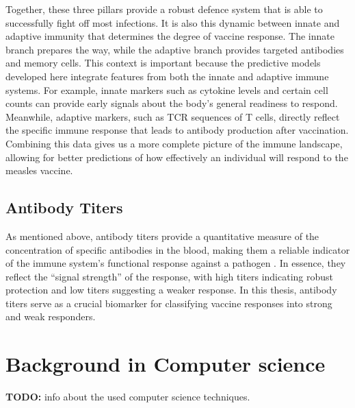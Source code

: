 \documentclass[12pt,a4paper]{report}
\newcommand{\todo}[1]{%
  \par\noindent%
  \begin{tcolorbox}[colback=yellow, colframe=black, boxrule=0.5pt, sharp corners, width=\linewidth, before skip=5pt, after skip=5pt]
    \textbf{TODO:} #1
  \end{tcolorbox}%
  \par
}
\begin{document}
\noindent
Together, these three pillars provide a robust defence system that is able to successfully fight off most infections. It is also this dynamic between innate and adaptive immunity that determines the degree of vaccine response. The innate branch prepares the way, while the adaptive branch provides targeted antibodies and memory cells. This context is important because the predictive models developed here integrate features from both the innate and adaptive immune systems. For example, innate markers such as cytokine levels and certain cell counts can provide early signals about the body's general readiness to respond. Meanwhile, adaptive markers, such as TCR sequences of T cells, directly reflect the specific immune response that leads to antibody production after vaccination. Combining this data gives us a more complete picture of the immune landscape, allowing for better predictions of how effectively an individual will respond to the measles vaccine.

\subsection{Antibody Titers}
\label{sec:antibody_titers}
As mentioned above, antibody titers provide a quantitative measure of the concentration of specific antibodies in the blood, making them a reliable indicator of the immune system’s functional response against a pathogen \cite{plotkin2010correlates}. In essence, they reflect the “signal strength” of the response, with high titers indicating robust protection and low titers suggesting a weaker response. In this thesis, antibody titers serve as a crucial biomarker for classifying vaccine responses into strong and weak responders.

\pagebreak
\section{Background in Computer science}
\todo{info about the used computer science techniques.}
\pagebreak
\end{document}
